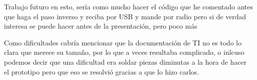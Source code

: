 		Trabajo futuro en esto, sería como mucho hacer el código que he comentado antes que haga el paso inverso y reciba por USB y mande por radio pero si de verdad interesa se puede hacer antes de la presentación, pero poco más

		Como dificultades cabría mencionar que la documentación de TI no es todo lo clara que merece su tamaño, por lo que a veces resultaba complicado, o inlcuso podemos decir que una dificultad era soldar piezas diminutas a la hora de hacer el prototipo pero que eso se resolvió gracias a que lo hizo carlos.
















